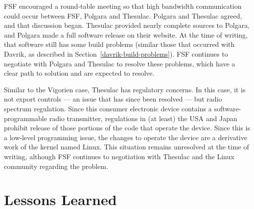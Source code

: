 \documentclass[12pt]{report}
\begin{document}
FSF encouraged a round-table meeting so that high bandwidth communication
could occur between FSF, Polgara and Thesulac.  Polgara and Thesulac
agreed, and that discussion began.  Thesulac provided nearly complete
sources to Polgara, and Polgara made a full software release on their
website.  At the time of writing, that software still has some build
problems (similar those that occurred with Davrik, as described in
Section~\ref{davrik-build-problems}).  FSF continues to negotiate with
Polgara and Thesulac to resolve these problems, which have a clear path to
solution and are expected to resolve.

Similar to the Vigorien case, Thesulac has regulatory concerns.  In this
case, it is not export controls --- an issue that has since been resolved
--- but radio spectrum regulation.  Since this consumer electronic device
contains a software-programmable radio transmitter, regulations in (at
least) the USA and Japan prohibit release of those portions of the code
that operate the device.  Since this is a low-level programming issue, the
changes to operate the device are a derivative work of the kernel named
Linux.  This situation remains unresolved at the time of writing, although
FSF continues to negotiation with Thesulac and the Linux community
regarding the problem.

\section{Lessons Learned}
\end{document}
